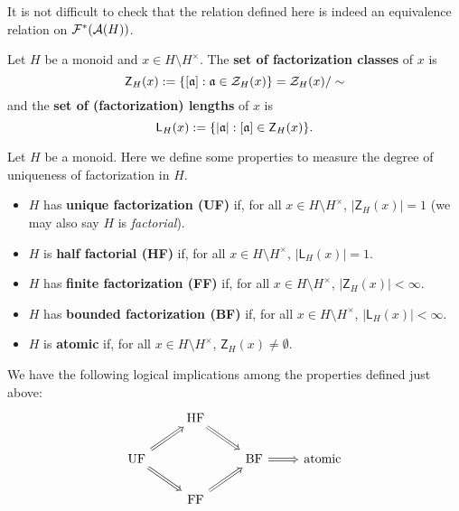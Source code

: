 It is not difficult to check that the relation defined here is indeed an equivalence relation on $\F^*(\A(H))$.

\begin{defn}
Let $H$ be a monoid and $x\in H\setminus H^\times$.
The \textbf{set of factorization classes} of $x$ is
\[ \mathsf{Z}_H(x) := \{ [\aa]: \aa\in \Z_H(x) \} = \Z_H(x)/\sim \]
and the \textbf{set of (factorization) lengths} of $x$ is
\[ \mathsf{L}_H(x) := \{ |\aa| : [\aa] \in \mathsf{Z}_H(x) \}. \]
\end{defn}

\begin{defn}
Let $H$ be a monoid.
Here we define some properties to measure the degree of uniqueness of factorization in $H$.
\begin{itemize}
\item $H$ has \textbf{unique factorization (UF)} if, for all $x\in H\setminus H^\times$, $|\mathsf{Z}_H(x)| = 1$ (we may also say $H$ is \textit{factorial}).
\item $H$ is \textbf{half factorial (HF)} if, for all $x\in H\setminus H^\times$, $|\mathsf{L}_H(x)| = 1$.
\item $H$ has \textbf{finite factorization (FF)} if, for all $x\in H\setminus H^\times$, $|\mathsf{Z}_H(x)| <\infty$.
\item $H$ has \textbf{bounded factorization (BF)} if, for all $x\in H\setminus H^\times$, $|\mathsf{L}_H(x)| < \infty$.
\item $H$ is \textbf{atomic} if, for all $x\in H\setminus H^\times$, $\mathsf{Z}_H(x) \neq \emptyset$.
\end{itemize}
\end{defn}

\begin{prop}
We have the following logical implications among the properties defined just above:
\[\begin{tikzcd}[arrows = Rightarrow]
 & \text{HF} \arrow{dr}&  &  \\
\text{UF} \arrow{ur}\arrow{dr}  &  & \text{BF} \arrow{r}& \text{atomic} \\
 & \text{FF} \arrow{ur} &  & 
\end{tikzcd}\]
\end{prop}



